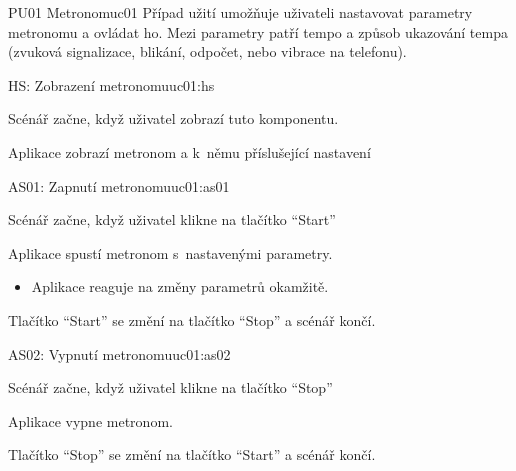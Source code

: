 \begin{usecase}{PU01 Metronom}{uc01}
    Případ užití umožňuje uživateli nastavovat parametry metronomu a ovládat ho. Mezi parametry patří tempo a způsob ukazování tempa (zvuková signalizace, blikání, odpočet, nebo vibrace na telefonu).

    \begin{scenario}{HS: Zobrazení metronomu}{uc01:hs}
        \item Scénář začne, když uživatel zobrazí tuto komponentu.
        \item Aplikace zobrazí metronom a k~němu příslušející nastavení
    \end{scenario}

    \begin{scenario}{AS01: Zapnutí metronomu}{uc01:as01}
        \item Scénář začne, když uživatel klikne na tlačítko \enquote{Start}
        \item Aplikace spustí metronom s~nastavenými parametry.
        \begin{itemize}
            \item Aplikace reaguje na změny parametrů okamžitě.
        \end{itemize}
        \item Tlačítko \enquote{Start} se změní na tlačítko \enquote{Stop} a scénář končí.
    \end{scenario}

    \begin{scenario}{AS02: Vypnutí metronomu}{uc01:as02}
        \item Scénář začne, když uživatel klikne na tlačítko \enquote{Stop}
        \item Aplikace vypne metronom.
        \item Tlačítko \enquote{Stop} se změní na tlačítko \enquote{Start} a scénář končí.
    \end{scenario}
\end{usecase}